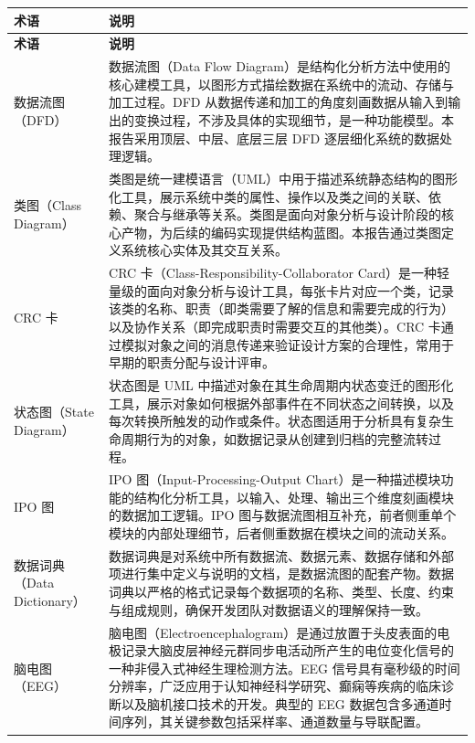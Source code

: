 \begin{longtable}{|p{36mm}|p{116mm}|}
\hline
\textbf{术语} & \textbf{说明} \\
\hline
\endfirsthead
\hline
\textbf{术语} & \textbf{说明} \\
\hline
\endhead

数据流图（DFD） &
数据流图（Data Flow Diagram）是结构化分析方法中使用的核心建模工具，以图形方式描绘数据在系统中的流动、存储与加工过程。DFD 从数据传递和加工的角度刻画数据从输入到输出的变换过程，不涉及具体的实现细节，是一种功能模型。本报告采用顶层、中层、底层三层 DFD 逐层细化系统的数据处理逻辑。 \\
\hline

类图（Class Diagram） &
类图是统一建模语言（UML）中用于描述系统静态结构的图形化工具，展示系统中类的属性、操作以及类之间的关联、依赖、聚合与继承等关系。类图是面向对象分析与设计阶段的核心产物，为后续的编码实现提供结构蓝图。本报告通过类图定义系统核心实体及其交互关系。 \\
\hline

CRC 卡 &
CRC 卡（Class-Responsibility-Collaborator Card）是一种轻量级的面向对象分析与设计工具，每张卡片对应一个类，记录该类的名称、职责（即类需要了解的信息和需要完成的行为）以及协作关系（即完成职责时需要交互的其他类）。CRC 卡通过模拟对象之间的消息传递来验证设计方案的合理性，常用于早期的职责分配与设计评审。 \\
\hline

状态图（State Diagram） &
状态图是 UML 中描述对象在其生命周期内状态变迁的图形化工具，展示对象如何根据外部事件在不同状态之间转换，以及每次转换所触发的动作或条件。状态图适用于分析具有复杂生命周期行为的对象，如数据记录从创建到归档的完整流转过程。 \\
\hline

IPO 图 &
IPO 图（Input-Processing-Output Chart）是一种描述模块功能的结构化分析工具，以输入、处理、输出三个维度刻画模块的数据加工逻辑。IPO 图与数据流图相互补充，前者侧重单个模块的内部处理细节，后者侧重数据在模块之间的流动关系。 \\
\hline

数据词典（Data Dictionary） &
数据词典是对系统中所有数据流、数据元素、数据存储和外部项进行集中定义与说明的文档，是数据流图的配套产物。数据词典以严格的格式记录每个数据项的名称、类型、长度、约束与组成规则，确保开发团队对数据语义的理解保持一致。 \\
\hline

脑电图（EEG） &
脑电图（Electroencephalogram）是通过放置于头皮表面的电极记录大脑皮层神经元群同步电活动所产生的电位变化信号的一种非侵入式神经生理检测方法。EEG 信号具有毫秒级的时间分辨率，广泛应用于认知神经科学研究、癫痫等疾病的临床诊断以及脑机接口技术的开发。典型的 EEG 数据包含多通道时间序列，其关键参数包括采样率、通道数量与导联配置。 \\
\hline


\end{longtable}
